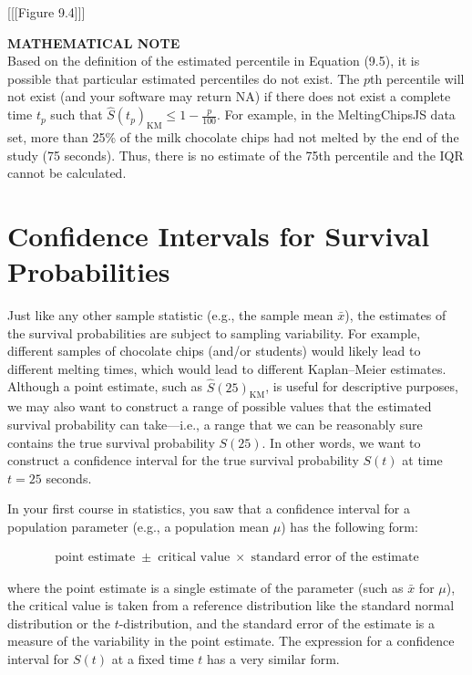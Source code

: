 \documentclass[
]{report}
\begin{document}
{[}{[}{[}Figure 9.4{]}{]}{]}

\large

\textbf{MATHEMATICAL NOTE}\\
Based on the definition of the estimated percentile in Equation (9.5), it is possible that particular estimated percentiles do not exist. The \(p\)th percentile will not exist (and your software may return NA) if there does not exist a complete time \(t_p\) such that \(\hat S(t_p)_{\mathrm{KM}} \le 1 - \tfrac{p}{100}\). For example, in the MeltingChipsJS data set, more than 25\% of the milk chocolate chips had not melted by the end of the study (75 seconds). Thus, there is no estimate of the 75th percentile and the IQR cannot be calculated.
\normalsize

\section{\texorpdfstring{\textbf{Confidence Intervals for Survival Probabilities}}{Confidence Intervals for Survival Probabilities}}\label{confidence-intervals-for-survival-probabilities}

Just like any other sample statistic (e.g., the sample mean \(\bar x\)), the estimates of the survival probabilities are subject to sampling variability. For example, different samples of chocolate chips (and/or students) would likely lead to different melting times, which would lead to different Kaplan--Meier estimates. Although a point estimate, such as \(\hat S(25)_{\mathrm{KM}}\), is useful for descriptive purposes, we may also want to construct a range of possible values that the estimated survival probability can take---i.e., a range that we can be reasonably sure contains the true survival probability \(S(25)\). In other words, we want to construct a confidence interval for the true survival probability \(S(t)\) at time \(t = 25\) seconds.

In your first course in statistics, you saw that a confidence interval for a population parameter (e.g., a population mean \(\mu\)) has the following form:

\begin{align}
\text{point estimate} \;\pm\; \text{critical value}\;\times\;\text{standard error of the estimate}
\tag{9.6}
\end{align}

where the point estimate is a single estimate of the parameter (such as \(\bar x\) for \(\mu\)), the critical value is taken from a reference distribution like the standard normal distribution or the \(t\)-distribution, and the standard error of the estimate is a measure of the variability in the point estimate. The expression for a confidence interval for \(S(t)\) at a fixed time \(t\) has a very similar form.
\end{document}

